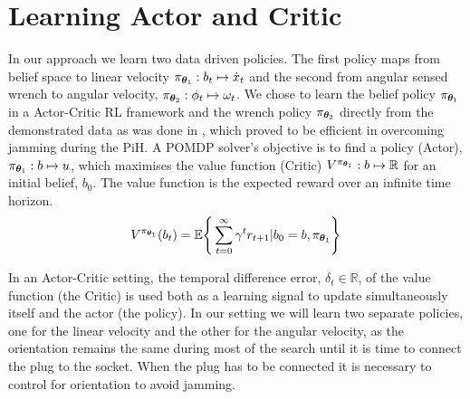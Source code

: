 

\section{Learning Actor and Critic}\label{ch4:learning-value-actor}

In our approach we learn two data driven policies. The first policy maps from belief space 
to linear velocity $\pi_{\boldsymbol{\theta}_1} : b_t \mapsto \dot{x}_t$ and the second from 
angular sensed wrench to angular velocity, $ \pi_{\boldsymbol{\theta}_2} : \phi_t \mapsto \omega_t$.
We chose to learn the belief policy $\pi_{\boldsymbol{\theta}_1}$ in a Actor-Critic RL framework 
and the wrench policy $\pi_{\boldsymbol{\theta}_2}$ directly from the demonstrated data as was done 
in \cite[Chap. 5]{Kronander2015}, which proved to be efficient in overcoming jamming during the PiH. 
A POMDP solver's objective is to find a policy (Actor), $\pi_{\boldsymbol{\theta}_1}: b \mapsto u$, which maximises 
the value function (Critic) $V^{\pi_{\boldsymbol{\theta}_1}} : b \mapsto \mathbb{R}$ for an initial belief, $b_{0}$. The value function
is the expected reward over an infinite time horizon.
\begin{equation}\label{eq:value_function}
  V^{\pi_{\boldsymbol{\theta}_1}}(b_t) = \mathbb{E}\Bigg\{ \sum_{t=0}^{\infty} \gamma^{t} r_{t+1} | b_0=b,\pi_{\boldsymbol{\theta}_1}\Bigg\}
\end{equation}

In an Actor-Critic setting, the temporal difference error, $\delta_t \in \mathbb{R}$, of the value function (the Critic) is 
used both as a learning signal to update simultaneously itself and the actor (the policy). In our setting we will 
learn two separate policies, one for the linear velocity and the other for the angular velocity,
as the orientation remains the same during most of the search until it is time to connect the plug to the socket. 
When the plug has to be connected it is necessary to control for orientation to avoid jamming. 

